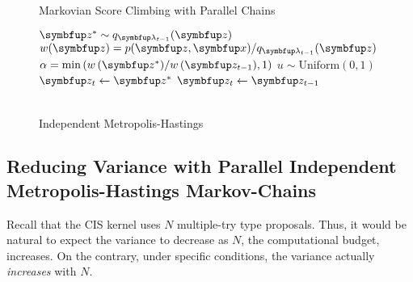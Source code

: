 \begin{figure}
  \centering
\begin{minipage}[t]{0.45\textwidth}
  \small
  \begin{algorithm2e}[H]
    \DontPrintSemicolon
    \SetAlgoLined
    \caption{Markovian Score Climbing with Parallel Chains}\label{alg:pimh}
  \end{algorithm2e}
\end{minipage}
\hspace{0.2in}
\begin{minipage}[t]{0.39\textwidth}
  \small
  \begin{algorithm2e}[H]
    \DontPrintSemicolon
    \SetAlgoLined
    \(\vz^* \sim q_{\vlambda_{t-1}}(\vz)\)\;
    \(w(\vz) = p(\vz,\vx)/q_{\vlambda_{t-1}}(\vz) \)\;
    \(\alpha = \min\left( w\,(\vz^*)/w\,(\vz_{t-1}), 1\right)\)\;
    \(u \sim \mathrm{Uniform}(0, 1) \)\;
        {
          \(\vz_t \leftarrow \vz^*\)
        }
        {
          \(\vz_t \leftarrow \vz_{t-1}\)
        }
        \caption{\\ Independent Metropolis-Hastings}\label{alg:imh}
  \end{algorithm2e}
\end{minipage}
\vspace{-0.15in}
\end{figure}
%
\subsection{Reducing Variance with Parallel Independent Metropolis-Hastings Markov-Chains}\label{section:cis_bias}
Recall that the CIS kernel uses \(N\) multiple-try type proposals.
Thus, it would be natural to expect the variance to decrease as \(N\), the computational budget, increases.
On the contrary, under specific conditions, the variance actually \textit{increases} with \(N\).

